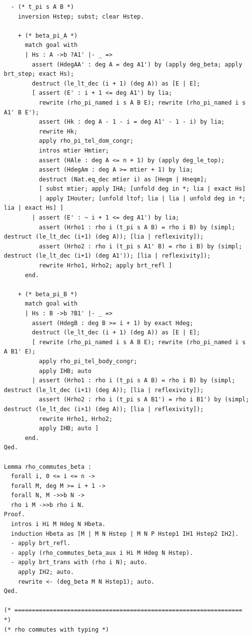 \begin{latin}
\begin{verbatim}
  - (* t_pi s A B *)
    inversion Hstep; subst; clear Hstep.

    + (* beta_pi_A *)
      match goal with
      | Hs : A ->b ?A1' |- _ =>
        assert (HdegAA' : deg A = deg A1') by (apply deg_beta; apply brt_step; exact Hs);
        destruct (le_lt_dec (i + 1) (deg A)) as [E | E];
        [ assert (E' : i + 1 <= deg A1') by lia;
          rewrite (rho_pi_named i s A B E); rewrite (rho_pi_named i s A1' B E');
          assert (Hk : deg A - 1 - i = deg A1' - 1 - i) by lia;
          rewrite Hk;
          apply rho_pi_tel_dom_congr;
          intros mtier Hmtier;
          assert (HAle : deg A <= n + 1) by (apply deg_le_top);
          assert (HdegAm : deg A >= mtier + 1) by lia;
          destruct (Nat.eq_dec mtier i) as [Heqm | Hneqm];
          [ subst mtier; apply IHA; [unfold deg in *; lia | exact Hs]
          | apply IHouter; [unfold ltof; lia | lia | unfold deg in *; lia | exact Hs] ]
        | assert (E' : ~ i + 1 <= deg A1') by lia;
          assert (Hrho1 : rho i (t_pi s A B) = rho i B) by (simpl; destruct (le_lt_dec (i+1) (deg A)); [lia | reflexivity]);
          assert (Hrho2 : rho i (t_pi s A1' B) = rho i B) by (simpl; destruct (le_lt_dec (i+1) (deg A1')); [lia | reflexivity]);
          rewrite Hrho1, Hrho2; apply brt_refl ]
      end.

    + (* beta_pi_B *)
      match goal with
      | Hs : B ->b ?B1' |- _ =>
        assert (HdegB : deg B >= i + 1) by exact Hdeg;
        destruct (le_lt_dec (i + 1) (deg A)) as [E | E];
        [ rewrite (rho_pi_named i s A B E); rewrite (rho_pi_named i s A B1' E);
          apply rho_pi_tel_body_congr;
          apply IHB; auto
        | assert (Hrho1 : rho i (t_pi s A B) = rho i B) by (simpl; destruct (le_lt_dec (i+1) (deg A)); [lia | reflexivity]);
          assert (Hrho2 : rho i (t_pi s A B1') = rho i B1') by (simpl; destruct (le_lt_dec (i+1) (deg A)); [lia | reflexivity]);
          rewrite Hrho1, Hrho2;
          apply IHB; auto ]
      end.
Qed.

Lemma rho_commutes_beta :
  forall i, 0 <= i <= n ->
  forall M, deg M >= i + 1 ->
  forall N, M ->>b N ->
  rho i M ->>b rho i N.
Proof.
  intros i Hi M Hdeg N Hbeta.
  induction Hbeta as [M | M N Hstep | M N P Hstep1 IH1 Hstep2 IH2].
  - apply brt_refl.
  - apply (rho_commutes_beta_aux i Hi M Hdeg N Hstep).
  - apply brt_trans with (rho i N); auto.
    apply IH2; auto.
    rewrite <- (deg_beta M N Hstep1); auto.
Qed.

(* ================================================================= *)
(* rho commutes with typing *)


\end{verbatim}
\end{latin}
